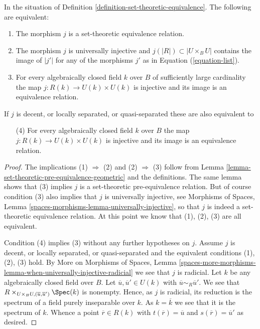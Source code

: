 \begin{lemma}
\label{lemma-set-theoretic-equivalence-geometric}
In the situation of Definition \ref{definition-set-theoretic-equivalence}.
The following are equivalent:
\begin{enumerate}
\item The morphism $j$ is a set-theoretic equivalence relation.
\item The morphism $j$ is universally injective and
$j(|R|) \subset |U \times_B U|$ contains the image of
$|j'|$ for any of the morphisms $j'$ as in Equation (\ref{equation-list}).
\item For every algebraically closed field $k$ over $B$ of sufficiently large
cardinality the map $j : R(k) \to U(k) \times U(k)$ is injective and
its image is an equivalence relation.
\end{enumerate}
If $j$ is decent, or locally separated, or quasi-separated
these are also equivalent to
\begin{enumerate}
\item[(4)] For every algebraically closed field $k$ over $B$
the map $j : R(k) \to U(k) \times U(k)$ is injective and its image
is an equivalence relation.
\end{enumerate}
\end{lemma}

\begin{proof}
The implications (1) $\Rightarrow$ (2) and (2) $\Rightarrow$ (3) follow from
Lemma \ref{lemma-set-theoretic-pre-equivalence-geometric}
and the definitions. The same lemma shows that (3) implies
$j$ is a set-theoretic pre-equivalence relation. But of course condition
(3) also implies that $j$ is universally injective, see
Morphisms of Spaces, Lemma \ref{spaces-morphisms-lemma-universally-injective},
so that $j$ is indeed a set-theoretic equivalence relation.
At this point we know that (1), (2), (3) are all equivalent.

\medskip\noindent
Condition (4) implies (3) without any further hypotheses on $j$. Assume $j$
is decent, or locally separated, or quasi-separated and the equivalent
conditions (1), (2), (3) hold. By
More on Morphisms of Spaces,
Lemma \ref{spaces-more-morphisms-lemma-when-universally-injective-radicial}
we see that $j$ is radicial.
Let $k$ be any algebraically closed field over $B$. Let
$\overline{u}, \overline{u}' \in U(k)$ with
$\overline{u} \sim_R \overline{u}'$. We see that
$R \times_{U \times_B U, (\overline{u}, \overline{u}')} \Spec(k)$
is nonempty. Hence, as $j$ is radicial, its reduction is the spectrum of a
field purely inseparable over $k$. As $k = \overline{k}$ we see that
it is the spectrum of $k$. Whence a point $\overline{r} \in R(k)$
with $t(\overline{r}) = \overline{u}$ and $s(\overline{r}) = \overline{u}'$
as desired.
\end{proof}


